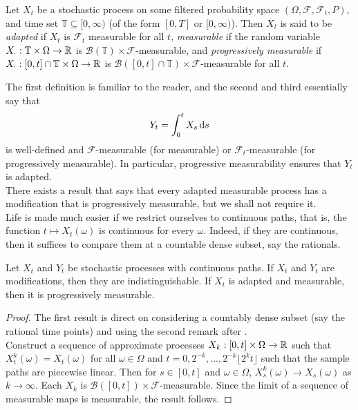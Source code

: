 \begin{definition}
	Let $X_t$ be a stochastic process on some filtered probability space $(\Omega,\mathcal{F},\mathcal{F}_t,P)$, and time set $\mathbb{T}\subseteq[0,\infty)$ (of the form $[0,T]$ or $[0,\infty)$). Then $X_t$ is said to be \textit{adapted} if $X_t$ is $\mathcal{F}_t$ measurable for all $t$, \textit{measurable} if the random variable $X_{\cdot}:\mathbb{T}\times\Omega\to\mathbb{R}$ is $\mathcal{B}(\mathbb{T})\times\mathcal{F}$-measurable, and \textit{progressively measurable} if $X_{\cdot}:[0,t]\cap\mathbb{T}\times\Omega\to\mathbb{R}$ is $\mathcal{B}([0,t]\cap\mathbb{T})\times\mathcal{F}$-measurable for all $t$.
\end{definition}

The first definition is familiar to the reader, and the second and third essentially say that
\[ Y_t = \int_0^t X_s\operatorname{d}\!{s} \]
is well-defined and $\mathcal{F}$-measurable (for measurable) or $\mathcal{F}_t$-measurable (for progressively measurable). In particular, progressive measurability ensures that $Y_t$ is adapted.\\
There exists a result that says that every adapted measurable process has a modification that is progressively measurable, but we shall not require it.\\

Life is made much easier if we restrict ourselves to continuous paths, that is, the function $t\mapsto X_t(\omega)$ is continuous for every $\omega$. Indeed, if they are continuous, then it suffices to compare them at a countable dense subset, say the rationals.

\begin{lemma}
	Let $X_t$ and $Y_t$ be stochastic processes with continuous paths. If $X_t$ and $Y_t$ are modifications, then they are indistinguishable. If $X_t$ is adapted and measurable, then it is progressively measurable.
\end{lemma}
\begin{proof}
	The first result is direct on considering a countably dense subset (say the rational time points) and using the second remark after .\\
	Construct a sequence of approximate processes $X_k : [0,t]\times\Omega\to\mathbb{R}$ such that $X_t^k(\omega)=X_t(\omega)$ for all $\omega\in\Omega$ and $t=0,2^{-k},\ldots,2^{-k}\lfloor 2^k t\rfloor$ such that the sample paths are piecewise linear. Then for $s\in[0,t]$ and $\omega\in\Omega$, $X_s^k(\omega)\to X_s(\omega)$ as $k\to\infty$. Each $X_k$ is $\mathcal{B}([0,t])\times\mathcal{F}$-measurable. Since the limit of a sequence of measurable maps is measurable, the result follows.
\end{proof}


